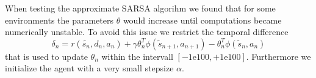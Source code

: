 \documentclass[journal, a4paper]{IEEEtran}
\theoremstyle{plain}
\theoremstyle{definition}
\begin{document}
When testing the approximate SARSA algorihm we found that for some environments the parameters $\theta$ would increase until computations became numerically unstable. To avoid this issue we restrict the temporal difference
\begin{equation}
	\delta_n = r(\tilde{s_n}, d_n, a_n) + \gamma \theta_n^T \phi(\tilde{s}_{n+1}, a_{n+1}) - \theta_n^T\phi(\tilde{s}_n, a_n)
\end{equation}
that is used to update $\theta_n$ within the intervall $[-1\mathrm{e}{100}, +1\mathrm{e}{100}]$. Furthermore we initialize the agent with a very small stepsize $\alpha$. 
\end{document}
